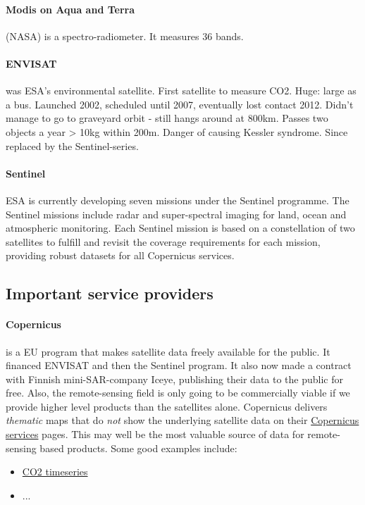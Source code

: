 \paragraph{Modis on Aqua and Terra} (NASA) is a spectro-radiometer. It measures 36 bands.

\paragraph{ENVISAT} was ESA's environmental satellite. First satellite to measure CO2. Huge: large as a bus. 
Launched 2002, scheduled until 2007, eventually lost contact 2012. Didn't manage to go to graveyard orbit - still hangs around at 800km.
Passes two objects a year > 10kg within 200m. Danger of causing Kessler syndrome.
Since replaced by the Sentinel-series.

\paragraph{Sentinel} ESA is currently developing seven missions under the Sentinel programme.
The Sentinel missions include radar and super-spectral imaging for land, ocean and atmospheric monitoring.
Each Sentinel mission is based on a constellation of two satellites to fulfill and revisit the coverage requirements
for each mission, providing robust datasets for all Copernicus services.


\subsection{Important service providers}

\paragraph{Copernicus} is a EU program that makes satellite data freely available for the public. It financed ENVISAT and then the Sentinel program.
It also now made a contract with Finnish mini-SAR-company Iceye, publishing their data to the public for free.
Also, the remote-sensing field is only going to be commercially viable if we provide higher level products than the satellites alone. 
Copernicus delivers \emph{thematic} maps that do \emph{not} show the underlying satellite data on their \href{https://www.copernicus.eu/en}{Copernicus services} pages.
This may well be the most valuable source of data for remote-sensing based products.
Some good examples include: 
\begin{itemize}
    \item \href{https://cds.climate.copernicus.eu/cdsapp#!/dataset/satellite-carbon-dioxide?tab=overview}{CO2 timeseries}
    \item ...
\end{itemize}


